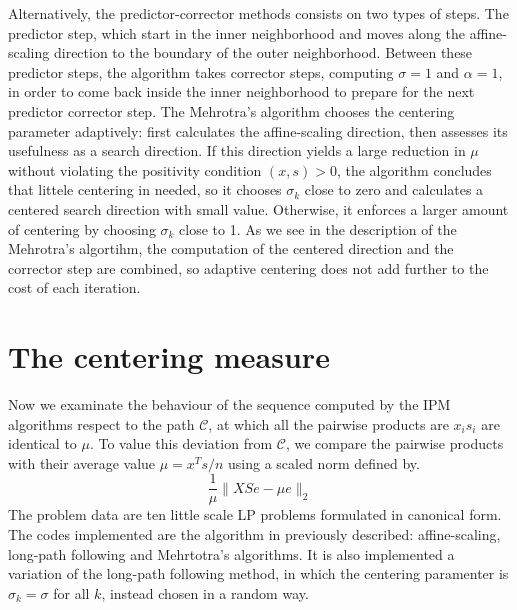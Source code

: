 \documentclass[a4paper,10 pt,titlepage,twoside]{book}
\theoremstyle{plain}
\theoremstyle{definition}
\theoremstyle{remark}
\begin{document}
Alternatively, the predictor-corrector methods consists on two types of steps. The predictor step, which start in the inner neighborhood and moves along the affine-scaling direction to the boundary of the outer neighborhood. Between these predictor steps, the algorithm takes corrector steps, computing $\sigma = 1$ and $\alpha= 1$, in order to come back inside the inner neighborhood to prepare for the next predictor corrector step. The Mehrotra's algorithm chooses the centering parameter adaptively: first calculates the affine-scaling direction, then assesses its usefulness as a search direction. If this direction yields a large reduction in $\mu$ without violating the positivity condition $(x, s)> 0$, the algorithm concludes that littele centering in needed, so it chooses $\sigma_{k}$ close to zero and calculates a centered search direction with small value. Otherwise, it enforces a larger amount of centering by choosing $\sigma_{k}$ close to 1. As we see in the description of the Mehrotra's algortihm, the computation of the centered direction and the corrector step are combined, so adaptive centering does not add further to the cost of each iteration. 

\section*{The centering measure}
Now we examinate the behaviour of the sequence computed by the IPM algorithms respect to the path $\mathcal{C}$, at which all the pairwise products are $x_{i}s_{i}$ are identical to $\mu$. To value this deviation from $\mathcal{C}$, we compare the pairwise products with their average value $\mu = x^{T}s/n$ using a scaled norm defined by. 
\begin{equation}
\frac{1}{\mu}\lVert XSe - \mu e \rVert_{2}
\end{equation}
The problem data are ten little scale LP problems formulated in canonical form. The codes implemented are the algorithm in previously described: affine-scaling, long-path following and Mehrtotra's algorithms. It is also implemented a variation of the long-path following method, in which the centering paramenter is $\sigma_{k}=\sigma$ for all $k$, instead chosen in a random way.
\newpage
\end{document}
